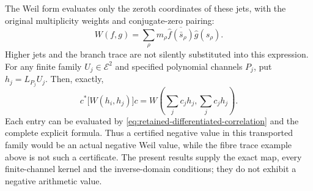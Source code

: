 The Weil form evaluates only the zeroth coordinates of these jets,
with the original multiplicity weights and conjugate-zero pairing:
\[
 W(f,g)=\sum_\rho m_\rho
   \overline{\widehat f(\bar s_\rho)}\widehat g(s_\rho).
\]
Higher jets and the branch trace are not silently substituted into
this expression. For any finite family $U_j\in\mathcal E^2$ and
specified polynomial channels $P_j$, put $h_j=L_{P_j}U_j$.
Then, exactly,
\begin{equation}
 c^*\bigl[W(h_i,h_j)\bigr]c
   =W\left(\sum_j c_jh_j,\sum_j c_jh_j\right).
 \label{eq:retained-genuine-witness-pullback}
\end{equation}
Each entry can be evaluated by
\eqref{eq:retained-differentiated-correlation} and the complete
explicit formula. Thus a certified negative value in this transported
family would be an actual negative Weil value, while the fibre trace
example above is not such a certificate. The present results supply
the exact map, every finite-channel kernel and the inverse-domain
conditions; they do not exhibit a negative arithmetic value.
